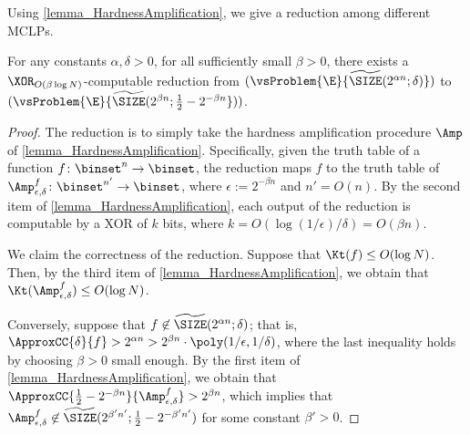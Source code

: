 \documentclass{toc}
\begin{document}
Using \cref{lemma_HardnessAmplification}, we give a reduction among
different MCLPs.
\begin{theorem}
  \label{thm_Amplification}
  For any constants $\alpha, \delta > 0$,
  for all sufficiently small $\beta > 0$,
  there exists
  a $\XOR_{O(\beta \log N)}$-computable reduction from
  $(\vsProblem{\E}{\widetilde{\SIZE}(2^{\alpha n}; \delta)})$
  to
  $(\vsProblem{\E}{\widetilde{\SIZE}(2^{\beta n}; \frac{1}{2} - 2^{-\beta n}}))$.
\end{theorem}

\begin{proof}
  The reduction is to simply take the hardness amplification procedure $\Amp$ of \cref{lemma_HardnessAmplification}.
  Specifically,
  given the truth table of a function $f \colon \binset^n \to \binset$, the reduction maps $f$ to the truth table of $\Amp^f_{\epsilon, \delta} \colon \binset^{n'} \to \binset$,
  where $\epsilon := 2^{- \beta n}$ and $n' = O(n)$.
  By the second item of \cref{lemma_HardnessAmplification},
  each output of the reduction is computable by a XOR of $k$ bits, where $k = O(\log (1 / \epsilon) / \delta ) = O(\beta n)$.

  We claim the correctness of the reduction.
  Suppose that $\Kt(f) \le O( \log N )$.
  Then, by the third item of \cref{lemma_HardnessAmplification},
  we obtain that $\Kt(\Amp_{\epsilon, \delta}^f) \le O(\log N)$.

  Conversely, suppose that $f \not\in \widetilde{\SIZE}(2^{\alpha n}; \delta)$;
  that is, $\ApproxCC{\delta}{f} > 2^{\alpha n} > 2^{\beta n} \cdot \poly(1 / \epsilon, 1 / \delta)$,
  where the last inequality holds by choosing $\beta > 0$ small enough.
  By the first item of \cref{lemma_HardnessAmplification},
  we obtain that $\ApproxCC{\frac{1}{2} - 2^{- \beta n}}{\Amp_{\epsilon, \delta}^f} > 2^{\beta n}$,
  which implies that $\Amp_{\epsilon, \delta}^f \not\in \widetilde{\SIZE}(2^{\beta' n'}; \frac{1}{2} - 2^{-\beta' n'})$
  for some constant $\beta' > 0$.
\end{proof}
\end{document}
